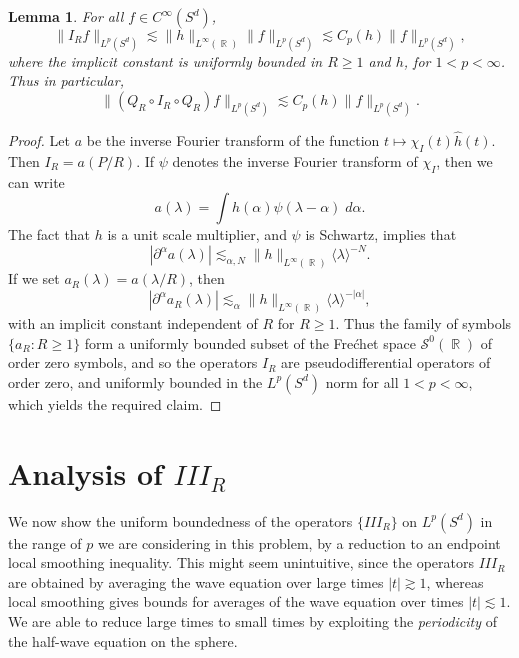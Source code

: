 \documentclass[dvipsnames,letterpaper,12pt]{article}
\DeclareMathOperator{\RR}{\mathbb{R}}
\newtheorem{lemma}[theorem]{Lemma}
\begin{document}
\begin{lemma} \label{SmallTimeInequalityLemma}
    For all $f \in C^\infty(S^d)$,
    \[ \| I_R f \|_{L^p(S^d)} \lesssim \| h \|_{L^\infty(\RR)} \| f \|_{L^p(S^d)} \lesssim C_p(h) \| f \|_{L^p(S^d)}, \] 
    where the implicit constant is uniformly bounded in $R \geq 1$ and $h$, for $1 < p < \infty$. Thus in particular,
    \[ \| (Q_R \circ I_R \circ Q_R) f \|_{L^p(S^d)} \lesssim C_p(h) \| f \|_{L^p(S^d)}. \]
\end{lemma}
\begin{proof}
    Let $a$ be the inverse Fourier transform of the function $t \mapsto \chi_I(t) \widehat{h}(t)$. Then $I_R = a(P/R)$. If $\psi$ denotes the inverse Fourier transform of $\chi_I$, then we can write
    \[ a(\lambda) = \int h(\alpha) \psi(\lambda - \alpha)\; d\alpha. \]
    The fact that $h$ is a unit scale multiplier, and $\psi$ is Schwartz, implies that
    \[ |\partial^\alpha a(\lambda)| \lesssim_{\alpha,N} \| h \|_{L^\infty(\RR)} \langle \lambda \rangle^{-N}. \]
    If we set $a_R(\lambda) = a(\lambda / R)$, then
    \[ |\partial^\alpha a_R(\lambda)| \lesssim_\alpha \| h \|_{L^\infty(\RR)} \langle \lambda \rangle^{-|\alpha|}, \]
    with an implicit constant independent of $R$ for $R \geq 1$. Thus the family of symbols $\{ a_R : R \geq 1 \}$ form a uniformly bounded subset of the Fre\'{c}het space $\mathcal{S}^0(\RR)$ of order zero symbols, and so the operators $I_R$ are pseudodifferential operators of order zero, and uniformly bounded in the $L^p(S^d)$ norm for all $1 < p < \infty$, which yields the required claim.
\end{proof}

\section{Analysis of $III_R$}

We now show the uniform boundedness of the operators $\{ III_R \}$ on $L^p(S^d)$ in the range of $p$ we are considering in this problem, by a reduction to an endpoint local smoothing inequality. This might seem unintuitive, since the operators $III_R$ are obtained by averaging the wave equation over large times $|t| \gtrsim 1$, whereas local smoothing gives bounds for averages of the wave equation over times $|t| \lesssim 1$. We are able to reduce large times to small times by exploiting the \emph{periodicity} of the half-wave equation on the sphere.
\end{document}
